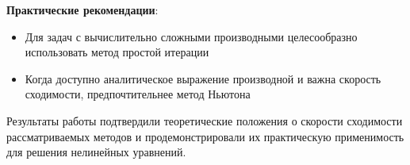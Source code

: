 \textbf{Практические рекомендации}:
\begin{itemize}
\item Для задач с вычислительно сложными производными целесообразно использовать метод простой итерации
\item Когда доступно аналитическое выражение производной и важна скорость сходимости, предпочтительнее метод Ньютона
\end{itemize}

Результаты работы подтвердили теоретические положения о скорости сходимости рассматриваемых методов и продемонстрировали 
их практическую применимость для решения нелинейных уравнений.

\pagebreak
